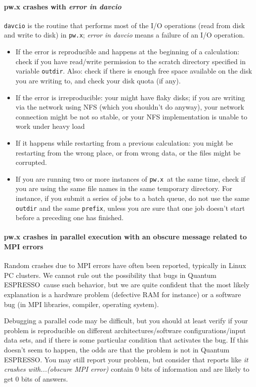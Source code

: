 \documentclass[12pt,a4paper]{article}
\def\qe{{\sc Quantum ESPRESSO}}
\def\pwx{\texttt{pw.x}}
\begin{document}
\paragraph{pw.x crashes with {\em error in davcio}}
\texttt{davcio} is the routine that performs most of the I/O operations (read
from disk and write to disk) in \pwx; {\em error in davcio} means a
failure of an I/O operation. 
\begin{itemize}
\item If the error is reproducible and happens at the beginning of a
  calculation: check if you have read/write permission to the scratch
  directory specified in variable \texttt{outdir}. Also: check if there is
  enough free space available on the disk you are writing to, and
  check your disk quota (if any).
\item If the error is irreproducible: your might have flaky disks; if
  you are writing via the network using NFS (which you shouldn't do
  anyway), your network connection might be not so stable, or your 
  NFS implementation is unable to work under heavy load 
\item If it happens while restarting from a previous calculation: you
  might be restarting from the wrong place, or from wrong  data, or
  the files might be corrupted. 
\item If you are running two or more instances of \pwx\ at
  the same time, check if you are using the same file names in the 
  same temporary directory. For instance, if you submit a series of
  jobs to a batch queue, do not use the same \texttt{outdir} and
  the same \texttt{prefix}, unless you are sure that one job doesn't
  start before a preceding one has finished.
\end{itemize}

\paragraph{pw.x crashes in parallel execution with an obscure message
  related to MPI errors} 
Random crashes due to MPI errors have often been reported, typically
in Linux PC clusters. We cannot rule out the possibility that bugs in
\qe\ cause such behavior, but we are quite confident that
the most likely explanation is a hardware problem (defective RAM  
for instance) or a software bug (in MPI libraries, compiler, operating
system). 

Debugging a parallel code may be difficult, but you should at least
verify if your problem is reproducible on different
architectures/software configurations/input data sets, and if  
there is some particular condition that activates the bug. If this
doesn't seem to happen, the odds are that the problem is not in
\qe. You may still report your problem, 
but consider that reports like {\em it crashes with...(obscure MPI error)}
contain 0 bits of information and are likely to get 0 bits of answers.
\end{document}
